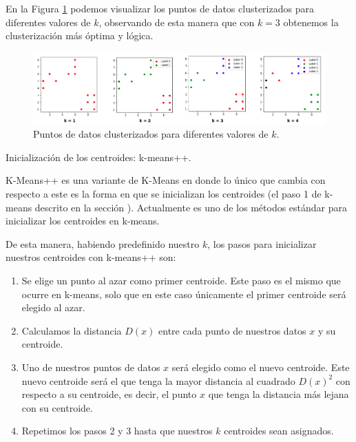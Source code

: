 \documentclass[12pt,a4paper]{article}
\makeatletter
\renewcommand\paragraph{\@startsection{paragraph}{4}{\z@}
            {-2.5ex\@plus -1ex \@minus -.25ex}
            {1.25ex \@plus .25ex}
            {\normalfont\normalsize\bfseries}}
\makeatother
\begin{document}
\begin{sloppypar}
\cleardoublepage
En la Figura \ref{fig:Elbow_3} podemos visualizar los puntos de datos clusterizados para diferentes valores de $k$, observando de esta manera que con $k=3$ obtenemos la clusterización más óptima y lógica.

\begin{figure}[H]    %
 \centering
 \includegraphics[width=1\textwidth]{images/Elbow_3.png}
 \captionsetup{justification=centering,margin=1cm}
 \caption{Puntos de datos clusterizados para diferentes valores de $k$.}
 \label{fig:Elbow_3}
\end{figure} 

\paragraph{Inicialización de los centroides: k-means++.}\label{k_means_plus_plus}

K-Means++\cite{K_means_plus_plus} es una variante de K-Means en donde lo único que cambia con respecto a este es la forma en que se inicializan los centroides (el paso 1 de k-means descrito en la sección \textit{}). Actualmente es uno de los métodos estándar para inicializar los centroides en k-means.

De esta manera, habiendo predefinido nuestro $k$, los pasos para inicializar nuestros centroides con k-means++ son:

\begin{enumerate}
\item Se elige un punto al azar como primer centroide. Este paso es el mismo que ocurre en k-means, solo que en este caso únicamente el primer centroide será elegido al azar.
\item Calculamos la distancia $D(x)$ entre cada punto de nuestros datos $x$ y su centroide. 
\item Uno de nuestros puntos de datos $x$ será elegido como el nuevo centroide. Este nuevo centroide será el que tenga la mayor distancia al cuadrado $D(x)^2$ con respecto a su centroide, es decir, el punto $x$ que tenga la distancia más lejana con su centroide. 
\item Repetimos los pasos 2 y 3 hasta que nuestros $k$ centroides sean asignados.
\end{enumerate}


\end{sloppypar}
\end{document}
